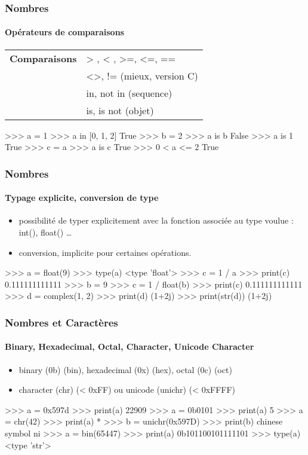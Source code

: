 \begin{frame}[fragile]
\frametitle{Nombres}
\framesubtitle{Opérateurs de comparaisons}
\begin{tabular}{ll}
{\bfseries Comparaisons} & > , < , >=, <=, == \\
 & <>, != (mieux, version C) \\
 & in, not in (sequence) \\
 & is, is not (objet) 
\end{tabular}
\begin{pythonConsole}
>>> a = 1 
>>> a in [0, 1, 2]
True
>>> b = 2
>>> a is b
False
>>> a is 1
True
>>> c = a
>>> a is c
True
>>> 0 < a <= 2
True
\end{pythonConsole}
\end{frame}
\begin{frame}[fragile]
\frametitle{Nombres}
\framesubtitle{Typage explicite, conversion de type}
\begin{itemize}
 \item possibilité de typer explicitement avec la fonction associée au type voulue : int(), float() \dots
 \item conversion, implicite pour certaines opérations. 
\end{itemize}
\begin{pythonConsole}
>>> a = float(9)
>>> type(a)
<type 'float'>
>>> c = 1 / a
>>> print(c)
0.111111111111
>>> b = 9
>>> c = 1 / float(b)
>>> print(c)
0.111111111111
>>> d = complex(1, 2)
>>> print(d)
(1+2j)
>>> print(str(d))
(1+2j)
\end{pythonConsole}
\end{frame}
\begin{frame}[fragile]
\frametitle{Nombres et Caractères}
\framesubtitle{Binary, Hexadecimal, Octal, Character, Unicode Character}
\begin{itemize}
 \item binary (0b) (bin), hexadecimal (0x) (hex), octal (0c) (oct) 
 \item character (chr) (< 0xFF) ou unicode (unichr) (< 0xFFFF)
\end{itemize}
\begin{pythonConsole}
>>> a = 0x597d
>>> print(a)
22909
>>> a = 0b0101
>>> print(a)
5
>>> a = chr(42)
>>> print(a)
*
>>> b = unichr(0x597D)
>>> print(b)
chinese symbol ni
>>> a = bin(65447)
>>> print(a)
0b101100101111101
>>> type(a)
<type 'str'>
\end{pythonConsole}
\end{frame}
